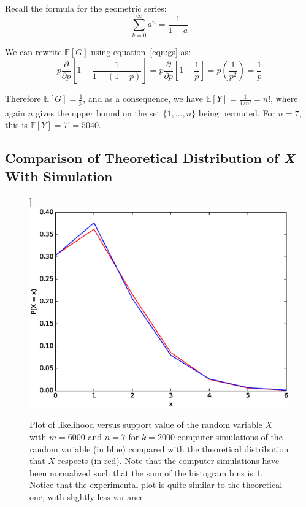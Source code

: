 \documentclass[11pt, oneside]{article}   	%
\begin{document}
Recall the formula for the geometric series:
\begin{equation}\label{eqn:gs}
\sum_{k = 0}^{\infty}a^n = \frac{1}{1-a}
\end{equation}

We can rewrite $\mathbb{E}[G]$ using equation~\ref{eqn:gs} as:
\begin{equation*}
p \frac{\partial}{\partial p} \left[1 - \frac{1}{1 - (1 - p)}\right] =
p \frac{\partial}{\partial p} \left[1 - \frac{1}{p}\right] =
p \left(\frac{1}{p^2}\right) =
\frac{1}{p}
\end{equation*}

Therefore $\mathbb{E}[G] = \frac{1}{p}$, and as a consequence, we have $\mathbb{E}[Y] = \frac{1}{1/n!} = n!$, where again $n$ gives the upper bound on the set $\{1, \dots, n\}$ being permuted. For $n = 7$, this is $\mathbb{E}[Y] = 7! = 5040$.

\subsection{Comparison of Theoretical Distribution of \textit{X} With Simulation}

\begin{figure}]\label{fig:x}
\includegraphics[scale=.5]{part_1_problem_4}
\caption{Plot of likelihood versus support value of the random variable $X$ with $m = 6000$ and $n = 7$ for $k = 2000$ computer simulations of the random variable (in blue) compared with the theoretical distribution that $X$ respects (in red). Note that the computer simulations have been normalized such that the sum of the histogram bins is $1$. Notice that the experimental plot is quite similar to the theoretical one, with slightly less variance.}
\end{figure}
\end{document}
